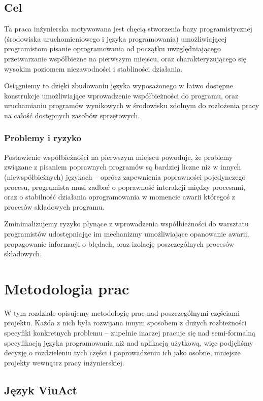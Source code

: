 \documentclass[11pt,oneside,a4paper,titlepage,onecolumn]{book}
\begin{document}
\section{Cel}

Ta praca inżynierska motywowana jest chęcią stworzenia bazy programistycznej (środowiska uruchomieniowego i
języka programowania) umożliwiającej programistom pisanie oprogramowania od początku uwzględniającego
przetwarzanie współbieżne na pierwszym miejscu, oraz charakteryzującego się wysokim poziomem niezawodności i
stabliności działania.

Osiągniemy to dzięki zbudowaniu języka wyposażonego w łatwo dostępne konstrukcje umożliwiające wprowadzenie
współbieżności do programu, oraz uruchamianiu programów wynikowych w środowisku zdolnym do rozłożenia pracy na
całość dostępnych zasobów sprzętowych.

\subsection{Problemy i ryzyko}

Postawienie współbieżności na pierwszym miejscu powoduje, że problemy związane z pisaniem poprawnych programów
są bardziej liczne niż w innych (niewspółbieżnych) językach -- oprócz zapewnienia poprawności pojedynczego
procesu, programista musi zadbać o poprawność interakcji między procesami, oraz o stabilność działania
oprogramowania w momencie awarii któregoś z procesów składowych programu.

Zminimalizujemy ryzyko płynące z wprowadzenia współbieżności do warsztatu programistów udostępniając im
mechanizmy umożliwiające opanowanie awarii, propagowanie informacji o błędach, oraz izolację poszczególnych
procesów składowych.

\chapter{Metodologia prac}

W tym rozdziale opisujemy metodologię prac nad poszczególnymi częściami projektu. Każda z nich była rozwijana
innym sposobem z dużych rozbieżności specyfiki konkretnych problemu -- zupełnie inaczej pracuje się nad
semi-formalną specyfikacją języka programowania niż nad aplikacją użytkową, więc podjęliśmy decyzję o
rozdzieleniu tych części i poprowadzeniu ich jako osobne, mniejsze projekty wewnątrz pracy inżynierskiej.

\section{Język ViuAct}
\end{document}
